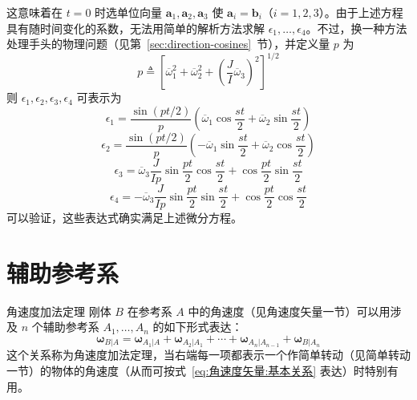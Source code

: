 \begin{example}
    这意味着在 $t=0$ 时选单位向量 $\mathbf{a}_1,\mathbf{a}_2,\mathbf{a}_3$ 使 $\mathbf{a}_i=\mathbf{b}_i$（$i=1,2,3$）。由于上述方程具有随时间变化的系数，无法用简单的解析方法求解 $\epsilon_1,\dots,\epsilon_4$。不过，换一种方法处理手头的物理问题（见第~\ref{sec:direction-cosines}~节），并定义量 $p$ 为
    \begin{equation}
        p \triangleq \left[\overline{\omega}_1^2+\overline{\omega}_2^2+\left(\frac{J}{I}\overline{\omega}_3\right)^2\right]^{1/2}
        \label{eq:角速度欧拉:常数p}
    \end{equation}
    则 $\epsilon_1,\epsilon_2,\epsilon_3,\epsilon_4$ 可表示为
    \begin{equation}
        \epsilon_1 = \frac{\sin(pt/2)}{p}\left(\overline{\omega}_1\cos\frac{st}{2}+\overline{\omega}_2\sin\frac{st}{2}\right)
    \end{equation}
    \begin{equation}
        \epsilon_2 = \frac{\sin(pt/2)}{p}\left(-\overline{\omega}_1\sin\frac{st}{2}+\overline{\omega}_2\cos\frac{st}{2}\right)
    \end{equation}
    \begin{equation}
        \epsilon_3 = \overline{\omega}_3\frac{J}{Ip}\sin\frac{pt}{2}\cos\frac{st}{2}+\cos\frac{pt}{2}\sin\frac{st}{2}
    \end{equation}
    \begin{equation}
        \epsilon_4 = -\overline{\omega}_3\frac{J}{Ip}\sin\frac{pt}{2}\sin\frac{st}{2}+\cos\frac{pt}{2}\cos\frac{st}{2}
    \end{equation}
    可以验证，这些表达式确实满足上述微分方程。
\end{example}

\section{辅助参考系}
\begin{myTheorem}{角速度加法定理}
刚体 $B$ 在参考系 $A$ 中的角速度（见角速度矢量一节）可以用涉及 $n$ 个辅助参考系 $A_1,\dots,A_n$ 的如下形式表达：
\begin{equation}
    \bm{\omega}_{B|A} = \bm{\omega}_{A_1|A} + \bm{\omega}_{A_2|A_1} + \cdots + \bm{\omega}_{A_n|A_{n-1}} + \bm{\omega}_{B|A_n}
    \label{eq:辅助参考系:角速度加法定理}
\end{equation}
这个关系称为角速度加法定理，当右端每一项都表示一个作简单转动（见简单转动一节）的物体的角速度（从而可按式~\eqref{eq:角速度矢量:基本关系} 表达）时特别有用。
\end{myTheorem}

